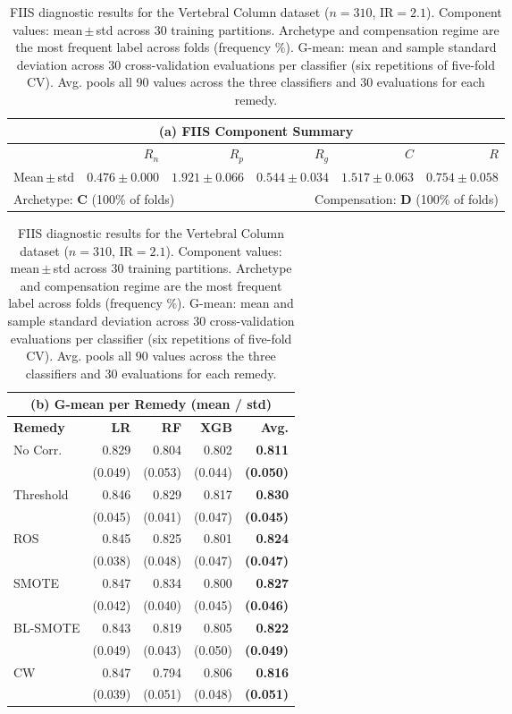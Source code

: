 \begin{table}[ht]
\centering
\scriptsize
\caption{FIIS diagnostic results for the Vertebral Column dataset ($n=310$, IR$=2.1$). Component values: mean\,$\pm$\,std across 30 training partitions. Archetype and compensation regime are the most frequent label across folds (frequency \%). G-mean: mean and sample standard deviation across 30 cross-validation evaluations per classifier (six repetitions of five-fold CV). Avg. pools all 90 values across the three classifiers and 30 evaluations for each remedy.}
\label{tab:vertebral_diagnostic}
\begin{tabular}{lrrrrr}
\toprule
\multicolumn{6}{c}{\textbf{(a) FIIS Component Summary}} \\
\midrule
& $R_n$ & $R_p$ & $R_g$ & $C$ & $R$ \\
\midrule
    Mean\,$\pm$\,std & $0.476\pm0.000$ & $1.921\pm0.066$ & $0.544\pm0.034$ & $1.517\pm0.063$ & $0.754\pm0.058$ \\
\midrule
\multicolumn{3}{l}{Archetype: \textbf{C} (100\% of folds)} &\multicolumn{3}{r}{Compensation: \textbf{D} (100\% of folds)} \\
\bottomrule
\end{tabular}
\medskip
\begin{tabular}{lrrrr}
\toprule
\multicolumn{5}{c}{\textbf{(b) G-mean per Remedy (mean / std)}} \\
\midrule
\textbf{Remedy} & \textbf{LR} & \textbf{RF} & \textbf{XGB} & \textbf{Avg.} \\
\midrule
    No Corr. & 0.829 & 0.804 & 0.802 & \textbf{0.811} \\
    & (0.049) & (0.053) & (0.044) & \textbf{(0.050)} \\
\midrule
    Threshold & 0.846 & 0.829 & 0.817 & \textbf{0.830} \\
    & (0.045) & (0.041) & (0.047) & \textbf{(0.045)} \\
\midrule
    ROS & 0.845 & 0.825 & 0.801 & \textbf{0.824} \\
    & (0.038) & (0.048) & (0.047) & \textbf{(0.047)} \\
\midrule
    SMOTE & 0.847 & 0.834 & 0.800 & \textbf{0.827} \\
    & (0.042) & (0.040) & (0.045) & \textbf{(0.046)} \\
\midrule
    BL-SMOTE & 0.843 & 0.819 & 0.805 & \textbf{0.822} \\
    & (0.049) & (0.043) & (0.050) & \textbf{(0.049)} \\
\midrule
    CW & 0.847 & 0.794 & 0.806 & \textbf{0.816} \\
    & (0.039) & (0.051) & (0.048) & \textbf{(0.051)} \\
\bottomrule
\end{tabular}
\end{table}
